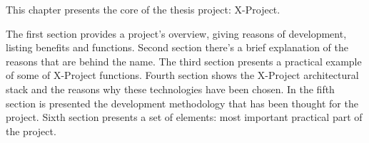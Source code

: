 This chapter presents the core of the thesis project: X-Project.

The first section provides a project's overview, giving reasons of development, listing benefits and functions. Second section there's a brief explanation of the reasons that are behind the name. The third section presents a practical example of some of X-Project functions. Fourth section shows the X-Project architectural stack and the reasons why these technologies have been chosen. In the fifth section is presented the development methodology that has been thought for the project. Sixth section presents a set of elements: most important practical part of the project.